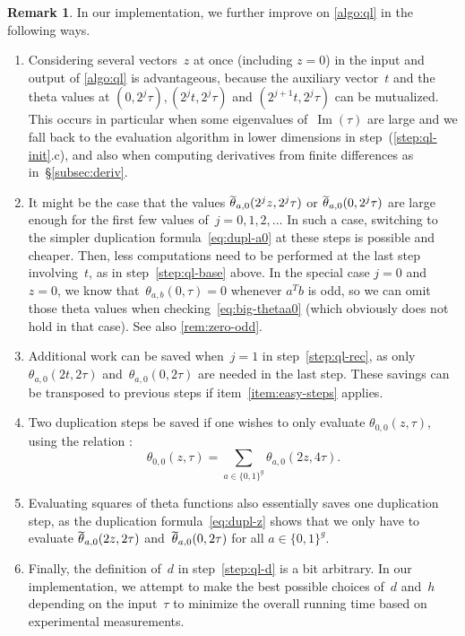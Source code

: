 \documentclass[12pt,oneside]{amsart}
\numberwithin{equation}{section}
\theoremstyle{definition}
\newtheorem{rem}[equation]{Remark}
\DeclareMathOperator{\im}{Im}
\DeclareMathOperator{\thetatilde}{\rlap{\raisebox{-0.1ex}{$\widetilde{\phantom{\,t}}$}}\theta}
\begin{document}
\begin{rem}
  \label{rem:ql-improvements}
  In our implementation, we further improve on \cref{algo:ql} in the
  following ways.
  \begin{enumerate}
  \item \label{item:several-z} Considering several vectors~$z$ at once
    (including $z=0$) in the input and output of \cref{algo:ql} is
    advantageous, because the auxiliary vector~$t$ and the theta values at
    $(0,2^j\tau), (2^j t,2^j\tau)$ and $(2^{j+1}t,2^j\tau)$ can be
    mutualized. This occurs in particular when some eigenvalues of~$\im(\tau)$
    are large and we fall back to the evaluation algorithm in lower dimensions
    in step~(\ref{step:ql-init}.c), and also when computing derivatives from
    finite differences as in~§\ref{subsec:deriv}.
  \item \label{item:easy-steps} It might be the case that the values
    $\thetatilde_{a,0}(2^j z,2^j\tau)$ or $\thetatilde_{a,0}(0,2^j\tau)$ are
    large enough for the first few values of~$j=0,1,2,\ldots$ In such a case,
    switching to the simpler duplication formula~\eqref{eq:dupl-a0} at these
    steps is possible and cheaper. Then, less computations need to be performed
    at the last step involving~$t$, as in step~\eqref{step:ql-base} above. In
    the special case $j=0$ and~$z=0$, we know that~$\theta_{a,b}(0,\tau)=0$
    whenever $a^Tb$ is odd, so we can omit those theta values when
    checking~\eqref{eq:big-thetaa0} (which obviously does not hold in that
    case). See also \cref{rem:zero-odd}.
  \item \label{item:no-th0} Additional work can be saved when~$j=1$ in
    step~\eqref{step:ql-rec}, as only~$\theta_{a,0}(2t,2\tau)$
    and~$\theta_{a,0}(0,2\tau)$ are needed in the last step. These savings can
    be transposed to previous steps if item~\eqref{item:easy-steps} applies.
  \item \label{item:only-00} Two duplication steps be saved if one wishes to
    only evaluate $\theta_{0,0}(z,\tau)$, using the relation \cite[(3.10)
    p.\,38]{cossetApplicationsFonctionsTheta2011}:
    \begin{displaymath}
      \theta_{0,0}(z,\tau) = \sum_{a\in \{0,1\}^g} \theta_{a,0}(2z, 4\tau).
    \end{displaymath}
  \item \label{item:squares} Evaluating squares of theta functions also
    essentially saves one duplication step, as the duplication
    formula~\eqref{eq:dupl-z} shows that we only have to evaluate
    $\thetatilde_{a,0}(2z,2\tau)$ and~$\thetatilde_{a,0}(0,2\tau)$ for
    all $a\in \{0,1\}^g$.
  \item \label{item:better-d} Finally, the definition of~$d$ in
    step~\eqref{step:ql-d} is a bit arbitrary. In our implementation, we
    attempt to make the best possible choices of~$d$ and~$h$ depending on the
    input~$\tau$ to minimize the overall running time based on experimental
    measurements.
  \end{enumerate}


\end{rem}
\end{document}

